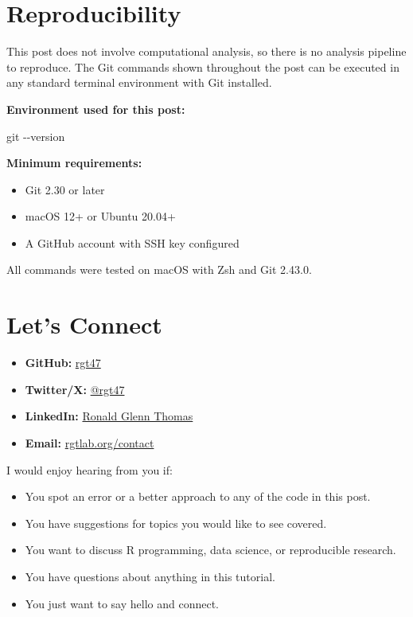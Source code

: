 \documentclass[
  letterpaper,
  DIV=11,
  numbers=noendperiod]{scrartcl}
\newenvironment{Shaded}{\begin{snugshade}}{\end{snugshade}}
\newcommand{\AttributeTok}[1]{\textcolor[rgb]{0.40,0.45,0.13}{#1}}
\newcommand{\FunctionTok}[1]{\textcolor[rgb]{0.28,0.35,0.67}{#1}}
\providecommand{\tightlist}{%
  \setlength{\itemsep}{0pt}\setlength{\parskip}{0pt}}
\begin{document}
\section{Reproducibility}\label{reproducibility}

This post does not involve computational analysis, so there is no
analysis pipeline to reproduce. The Git commands shown throughout the
post can be executed in any standard terminal environment with Git
installed.

\textbf{Environment used for this post:}

\begin{Shaded}
\begin{Highlighting}[]
\FunctionTok{git} \AttributeTok{{-}{-}version}
\end{Highlighting}
\end{Shaded}

\textbf{Minimum requirements:}

\begin{itemize}
\tightlist
\item
  Git 2.30 or later
\item
  macOS 12+ or Ubuntu 20.04+
\item
  A GitHub account with SSH key configured
\end{itemize}

All commands were tested on macOS with Zsh and Git 2.43.0.

\section{Let's Connect}\label{lets-connect}

\begin{itemize}
\tightlist
\item
  \textbf{GitHub:} \href{https://github.com/rgt47}{rgt47}
\item
  \textbf{Twitter/X:} \href{https://twitter.com/rgt47}{@rgt47}
\item
  \textbf{LinkedIn:} \href{https://linkedin.com/in/rgthomaslab}{Ronald
  Glenn Thomas}
\item
  \textbf{Email:} \href{https://rgtlab.org/contact}{rgtlab.org/contact}
\end{itemize}

I would enjoy hearing from you if:

\begin{itemize}
\tightlist
\item
  You spot an error or a better approach to any of the code in this
  post.
\item
  You have suggestions for topics you would like to see covered.
\item
  You want to discuss R programming, data science, or reproducible
  research.
\item
  You have questions about anything in this tutorial.
\item
  You just want to say hello and connect.
\end{itemize}
\end{document}
